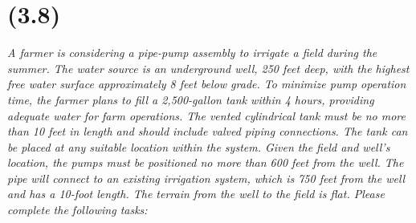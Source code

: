 \section{(3.8)}
\textit{A farmer is considering a pipe-pump assembly to irrigate a field during the summer. The water source is an underground well, 250 feet deep, with the highest free water surface approximately 8 feet below grade. To minimize pump operation time, the farmer plans to fill a 2,500-gallon tank within 4 hours, providing adequate water for farm operations. The vented cylindrical tank must be no more than 10 feet in length and should include valved piping connections. The tank can be placed at any suitable location within the system. Given the field and well's location, the pumps must be positioned no more than 600 feet from the well. The pipe will connect to an existing irrigation system, which is 750 feet from the well and has a 10-foot length. The terrain from the well to the field is flat. Please complete the following tasks:}

